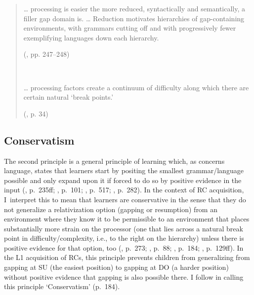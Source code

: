 
\begin{quote}
\begin{samepage}
\dots{} processing is easier the more reduced, syntactically and semantically, a filler gap domain is. \dots{} Reduction motivates hierarchies of gap-containing environments, with grammars cutting off and with progressively fewer exemplifying languages down each hierarchy. 
\par\nobreak\vspace{5pt}
\hfill (\cite{hawkins1999}, pp. 247--248)
\end{samepage}\\\vspace{12pt}

\begin{samepage}
\dots{} processing factors create a continuum of difficulty along which there are certain natural `break points.'
\par\nobreak\vspace{5pt}
\hfill (\cite{ogrady2011}, p. 34)
\end{samepage}
\end{quote}\vspace{-12pt}

\subsection{Conservatism}\label{acq-conservatism}

The second principle is a general principle of learning which, as concerns language, states that learners start by positing the smallest grammar/language possible and only expand upon it if forced to do so by positive evidence in the input (\cite{berwick1985}, p.~235ff; \cite{clark1992}, p.~101; \cite{fodor.sakas2005}, p.~517; \cite{pinker1994}, p.~282). In the context of RC acquisition, I~interpret this to mean that learners are conservative in the sense that they do not generalize a relativization option (gapping or resumption) from an environment where they know it to be permissible to an environment that places substantially more strain on the processor (one that lies across a natural break point in difficulty/complexity, i.e., to the right on the hierarchy) unless there is positive evidence for that option, too  (\cite{hawkins2004}, p.~273; \cite{keenan.comrie1977}, p.~88; \cite{ogrady2005}, p.~184; \cite{ogrady2022a}, p.~129ff). In the L1 acquisition of RCs, this principle prevents children from generalizing from gapping at SU (the easiest position) to gapping at DO (a harder position) without positive evidence that gapping is also possible there. I follow \textcite{ogrady2005} in calling this principle `Conservatism' (p.~184).

